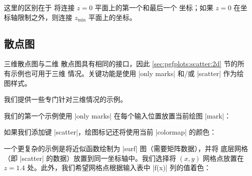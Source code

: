 {这里的区别在于 \PGFPlots{} 将连接 $z=0$ 平面上的第一个和最后一个
坐标；如果 $z=0$ 在坐标轴限制之外，则连接 $z_{\min}$
平面上的坐标。


\subsection{散点图}

三维散点图与二维
散点图具有相同的接口，因此 \ref{sec:pgfplots:scatter:2d} 节的所有示例也可用于三维
情况。关键功能是使用 |only marks| 和/或 |scatter| 作为绘图样式。

我们提供一些专门针对三维情况的示例。

我们的第一个示例使用 |only marks| 在每个输入位置放置当前绘图 |mark|：
%
\pgfplotsexpensiveexample
\begin{codeexample}[]
\end{codeexample}

如果我们添加键 |scatter|，绘图标记还将使用当前 |colormap| 的颜色：
%
\pgfplotsexpensiveexample
\begin{codeexample}[]
\end{codeexample}

一个更复杂的示例是将近似函数绘制为 |surf| 图（需要矩阵数据），并将
底层网格（即 |scatter| 的数据）放置到同一坐标轴中。我们选择将
$(x,y)$ 网格点放置在 $z=1.4$ 处。此外，我们希望网格点根据输入表中
|f(x)| 列的值着色：

}
